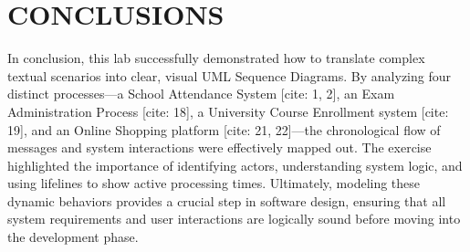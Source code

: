 \chapter{CONCLUSIONS}\label{ch:conclusion}

In conclusion, this lab successfully demonstrated how to translate complex textual scenarios into clear, visual UML Sequence Diagrams. By analyzing four distinct processes—a School Attendance System [cite: 1, 2], an Exam Administration Process [cite: 18], a University Course Enrollment system [cite: 19], and an Online Shopping platform [cite: 21, 22]—the chronological flow of messages and system interactions were effectively mapped out. The exercise highlighted the importance of identifying actors, understanding system logic, and using lifelines to show active processing times. Ultimately, modeling these dynamic behaviors provides a crucial step in software design, ensuring that all system requirements and user interactions are logically sound before moving into the development phase.